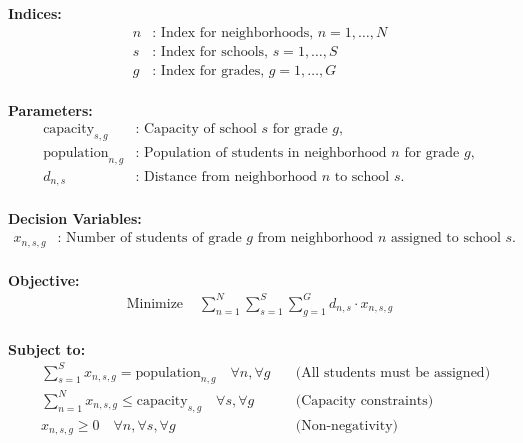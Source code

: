 \documentclass{article}
\begin{document}
\textbf{Indices:}
\begin{align*}
    n & \text{: Index for neighborhoods, } n = 1, \ldots, N \\
    s & \text{: Index for schools, } s = 1, \ldots, S \\
    g & \text{: Index for grades, } g = 1, \ldots, G \\
\end{align*}

\textbf{Parameters:}
\begin{align*}
    \text{capacity}_{s,g} & \text{: Capacity of school } s \text{ for grade } g, \\
    \text{population}_{n,g} & \text{: Population of students in neighborhood } n \text{ for grade } g, \\
    d_{n,s} & \text{: Distance from neighborhood } n \text{ to school } s. \\
\end{align*}

\textbf{Decision Variables:}
\begin{align*}
    x_{n,s,g} & \text{: Number of students of grade } g \text{ from neighborhood } n \text{ assigned to school } s. \\
\end{align*}

\textbf{Objective:}
\begin{align*}
    \text{Minimize } & \sum_{n=1}^{N} \sum_{s=1}^{S} \sum_{g=1}^{G} d_{n,s} \cdot x_{n,s,g} \\
\end{align*}

\textbf{Subject to:}
\begin{align*}
    & \sum_{s=1}^{S} x_{n,s,g} = \text{population}_{n,g} \quad \forall n, \forall g \quad & \text{(All students must be assigned)} \\
    & \sum_{n=1}^{N} x_{n,s,g} \leq \text{capacity}_{s,g} \quad \forall s, \forall g \quad & \text{(Capacity constraints)} \\
    & x_{n,s,g} \geq 0 \quad \forall n, \forall s, \forall g \quad & \text{(Non-negativity)}
\end{align*}
\end{document}
